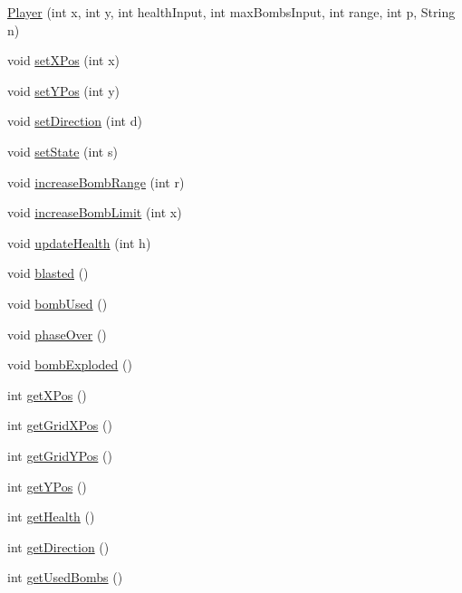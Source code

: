 \begin{DoxyCompactItemize}
\item 
\hyperlink{class_player_aa276b0ca5f210a31048fb4929e00a6b5}{Player} (int x, int y, int health\+Input, int max\+Bombs\+Input, int range, int p, String n)
\item 
void \hyperlink{class_player_a6169405e26100cc9d10e60d701171d14}{set\+X\+Pos} (int x)
\item 
void \hyperlink{class_player_a20babc9f961a026fcc7aaac5f8769be3}{set\+Y\+Pos} (int y)
\item 
void \hyperlink{class_player_a7ba0f4055816210ab2d9d665552e3a83}{set\+Direction} (int d)
\item 
void \hyperlink{class_player_a8e246afb1a58320ee83182e774ee98fa}{set\+State} (int s)
\item 
void \hyperlink{class_player_a5505703d7d5af25e11a4daceefb03cfe}{increase\+Bomb\+Range} (int r)
\item 
void \hyperlink{class_player_ae2ad118a0435e9414cfa890fe2599784}{increase\+Bomb\+Limit} (int x)
\item 
void \hyperlink{class_player_a3a9cccf5deb51d376068eb572c35a21b}{update\+Health} (int h)
\item 
void \hyperlink{class_player_aa753f19d3b1cc39ec2feaf2311de21bc}{blasted} ()
\item 
void \hyperlink{class_player_a78b1b36f3e4c60cbb278ee4f137d0a47}{bomb\+Used} ()
\item 
void \hyperlink{class_player_a95412f297578bc8cfdf46a538a25e9a2}{phase\+Over} ()
\item 
void \hyperlink{class_player_a30f161013b8d1aab47c651438bafeb30}{bomb\+Exploded} ()
\item 
int \hyperlink{class_player_a458088c2eeff500745b93001ee745bb3}{get\+X\+Pos} ()
\item 
int \hyperlink{class_player_afc249a531c27c856bdda91a93d8ec2e2}{get\+Grid\+X\+Pos} ()
\item 
int \hyperlink{class_player_a382e547f48d5d081e5edec8439d94cff}{get\+Grid\+Y\+Pos} ()
\item 
int \hyperlink{class_player_a49e9b428745bb572aa5380b51b5afb95}{get\+Y\+Pos} ()
\item 
int \hyperlink{class_player_a7ae395cce6cb36c6732e57f31787a381}{get\+Health} ()
\item 
int \hyperlink{class_player_a466088c4480791a464445d96d29877f6}{get\+Direction} ()
\item 
int \hyperlink{class_player_a31698fa7da3e19a859cd2af11c413ecf}{get\+Used\+Bombs} ()

\end{DoxyCompactItemize}
